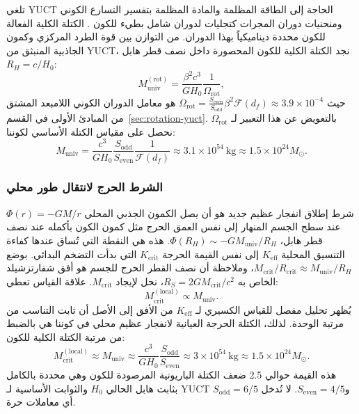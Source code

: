 \documentclass[12pt,a4paper]{article}
\begin{document}
	تلغي YUCT الحاجة إلى الطاقة المظلمة والمادة المظلمة بتفسير التسارع الكوني ومنحنيات دوران المجرات كتجليات لدوران شامل بطيء للكون \cite{AppendixΩ}. الكتلة الكلية الفعالة للكون محددة ديناميكياً بهذا الدوران. من التوازن بين قوة الطرد المركزي وكمون الجاذبية المنبثق من YUCT، نجد الكتلة الكلية للكون المحصورة داخل نصف قطر هابل \(R_H = c/H_0\):
	\begin{equation}
		M_{\mathrm{univ}}^{\mathrm{(rot)}} = \frac{\beta^2 c^3}{G H_0} \frac{1}{\Omega_{\mathrm{rot}}},
	\end{equation}
	حيث \(\Omega_{\mathrm{rot}} = \frac{S_{\mathrm{even}}}{S_{\mathrm{odd}}} \beta^2 \mathcal{F}(d_f) \approx 3.9 \times 10^{-4}\) هو معامل الدوران الكوني اللامبعد المشتق من المبادئ الأولى في القسم~\ref{sec:rotation-yuct}. بالتعويض عن هذا التعبير لـ \(\Omega_{\mathrm{rot}}\) نحصل على مقياس الكتلة الأساسي لكوننا:
	\begin{equation}
		M_{\mathrm{univ}} = \frac{c^3}{G H_0} \frac{S_{\mathrm{odd}}}{S_{\mathrm{even}}} \frac{1}{\mathcal{F}(d_f)} \approx 3.1 \times 10^{54}\ \mathrm{kg} \approx 1.5 \times 10^{24} M_{\odot}.
	\end{equation}
	
	\subsubsection{الشرط الحرج لانتقال طور محلي}
	
	شرط إطلاق انفجار عظيم جديد هو أن يصل الكمون الجذبي المحلي \(\Phi(r) = -GM/r\) عند سطح الجسم المنهار إلى نفس العمق الحرج مثل كمون الكون بأكمله عند نصف قطر هابل، \(\Phi(R_H) \sim -G M_{\mathrm{univ}}/R_H\). هذه هي النقطة التي تُساق عندها كفاءة التنسيق المحلية \(K_{\mathrm{eff}}\) إلى نفس القيمة الحرجة \(K_{\mathrm{crit}}\) التي بدأت التضخم البدائي. بوضع \(M_{\mathrm{crit}}/R_{\mathrm{crit}} \approx M_{\mathrm{univ}}/R_H\)، وملاحظة أن نصف القطر الحرج للجسم هو أفق شفارتزشيلد الخاص به \(R_S = 2GM_{\mathrm{crit}}/c^2\)، نحل لإيجاد \(M_{\mathrm{crit}}\). علاقة القياس تعطي:
	\begin{equation}
		M_{\mathrm{crit}}^{\mathrm{(local)}} \propto M_{\mathrm{univ}}.
	\end{equation}
	يُظهر تحليل مفصل للقياس الكسيري لـ \(K_{\mathrm{eff}}\) من الأفق إلى الأصل \cite{AppendixL} أن ثابت التناسب من مرتبة الوحدة. لذلك، الكتلة الحرجة العيانية لانفجار عظيم محلي في كوننا هي بالضبط من مرتبة الكتلة الكلية للكون:
	\begin{equation}
		\boxed{ M_{\mathrm{crit}}^{\mathrm{(local)}} \approx M_{\mathrm{univ}} \approx \frac{c^3}{G H_0} \frac{S_{\mathrm{odd}}}{S_{\mathrm{even}}} \approx 3 \times 10^{54}\ \mathrm{kg} \approx 1.5 \times 10^{24} M_{\odot} }.
		\label{eq:Mcrit-macro}
	\end{equation}
	هذه القيمة حوالي 2.5 ضعف الكتلة الباريونية المرصودة للكون وهي محددة بالكامل بثابت هابل الحالي \(H_0\) والثوابت الأساسية لـ YUCT \(S_{\mathrm{odd}}=6/5\) و\(S_{\mathrm{even}}=4/5\). لا تُدخل أي معاملات حرة.
	
\end{document}
